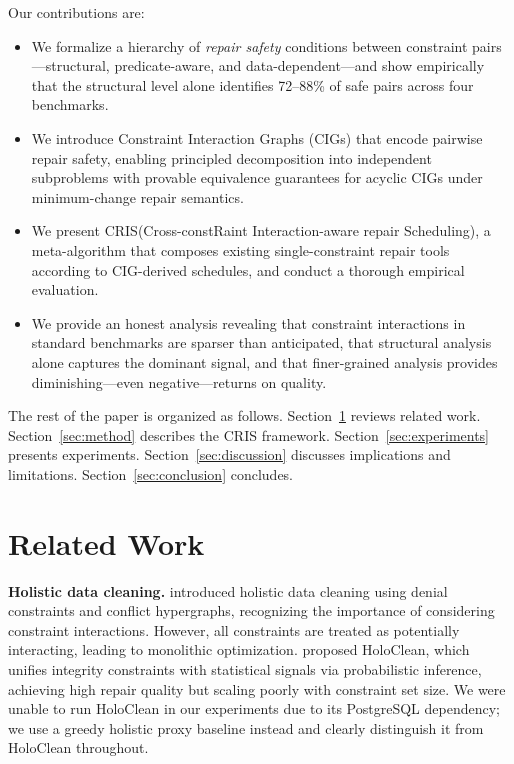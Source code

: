 \documentclass{article}
\newcommand{\cris}{\textsc{CRIS}\xspace}
\newcommand{\cigraph}{\textsc{CIG}\xspace}
\begin{document}
Our contributions are:
\begin{itemize}
  \item We formalize a hierarchy of \emph{repair safety} conditions between constraint pairs---structural, predicate-aware, and data-dependent---and show empirically that the structural level alone identifies 72--88\% of safe pairs across four benchmarks.
  \item We introduce Constraint Interaction Graphs (\cigraph{}s) that encode pairwise repair safety, enabling principled decomposition into independent subproblems with provable equivalence guarantees for acyclic CIGs under minimum-change repair semantics.
  \item We present \cris (Cross-constRaint Interaction-aware repair Scheduling), a meta-algorithm that composes existing single-constraint repair tools according to CIG-derived schedules, and conduct a thorough empirical evaluation.
  \item We provide an honest analysis revealing that constraint interactions in standard benchmarks are sparser than anticipated, that structural analysis alone captures the dominant signal, and that finer-grained analysis provides diminishing---even negative---returns on quality.
\end{itemize}

The rest of the paper is organized as follows. Section~\ref{sec:related} reviews related work. Section~\ref{sec:method} describes the \cris framework. Section~\ref{sec:experiments} presents experiments. Section~\ref{sec:discussion} discusses implications and limitations. Section~\ref{sec:conclusion} concludes.


\section{Related Work}
\label{sec:related}

\textbf{Holistic data cleaning.}
\citet{chu2013holistic} introduced holistic data cleaning using denial constraints and conflict hypergraphs, recognizing the importance of considering constraint interactions. However, all constraints are treated as potentially interacting, leading to monolithic optimization.
\citet{rekatsinas2017holoclean} proposed HoloClean, which unifies integrity constraints with statistical signals via probabilistic inference, achieving high repair quality but scaling poorly with constraint set size. We were unable to run HoloClean in our experiments due to its PostgreSQL dependency; we use a greedy holistic proxy baseline instead and clearly distinguish it from HoloClean throughout.
\end{document}
